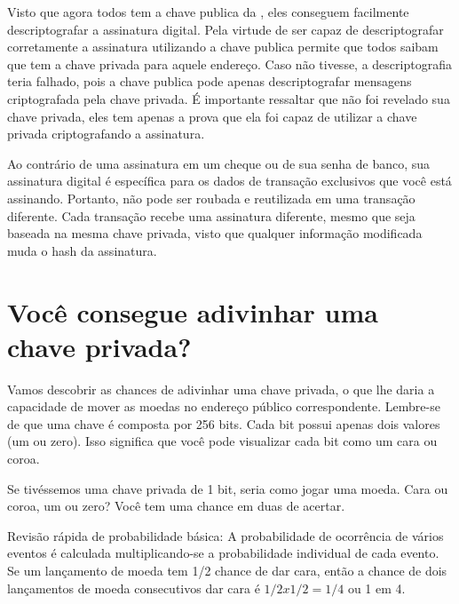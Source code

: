 Visto que agora todos tem a chave publica da \TraducaoNomeA, eles conseguem facilmente descriptografar a assinatura digital.
Pela virtude de ser capaz de descriptografar corretamente a assinatura utilizando a chave publica permite que todos saibam que \TraducaoNomeA tem a chave privada para aquele endereço.
Caso não tivesse, a descriptografia teria falhado, pois a chave publica pode apenas descriptografar mensagens criptografada pela chave privada.
É importante ressaltar que não foi revelado sua chave privada, eles tem apenas a prova que ela foi capaz de utilizar a chave privada criptografando a assinatura.


Ao contrário de uma assinatura em um cheque ou de sua senha de banco, sua assinatura digital é específica para os dados de transação exclusivos que você está assinando. Portanto, não pode ser roubada e reutilizada em uma transação diferente. Cada transação recebe uma assinatura diferente, mesmo que seja baseada na mesma chave privada, visto que qualquer informação modificada muda o hash da assinatura.

\section*{Você consegue adivinhar uma chave privada?}

Vamos descobrir as chances de adivinhar uma chave privada, o que lhe daria a capacidade de mover as moedas no endereço público correspondente. Lembre-se de que uma chave é composta por 256 bits. Cada bit possui apenas dois valores (um ou zero). Isso significa que você pode visualizar cada bit como um cara ou coroa.

Se tivéssemos uma chave privada de 1 bit, seria como jogar uma moeda. Cara ou coroa, um ou zero? Você tem uma chance em duas de acertar.

Revisão rápida de probabilidade básica: A probabilidade de ocorrência de vários eventos é calculada multiplicando-se a probabilidade individual de cada evento. Se um lançamento de moeda tem 1/2 chance de dar cara, então a chance de dois lançamentos de moeda consecutivos dar cara é $1/2 x 1/2 = 1/4$ ou 1 em 4.

